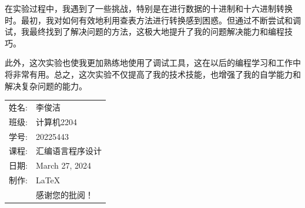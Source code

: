 \documentclass[12pt]{article}
\begin{document}
在实验过程中，我遇到了一些挑战，特别是在进行数据的十进制和十六进制转换时。最初，我对如何有效地利用查表方法进行转换感到困惑。但通过不断尝试和调试，我最终找到了解决问题的方法，这极大地提升了我的问题解决能力和编程技巧。

此外，这次实验也使我更加熟练地使用了调试工具，这在以后的编程学习和工作中将非常有用。总之，这次实验不仅提高了我的技术技能，也增强了我的自学能力和解决复杂问题的能力。
\begin{flushright}\begin{tabular}{rl}
    姓名: & 李俊洁\\
    班级: & 计算机2204 \\
    学号: & 20225443 \\
    课程: & 汇编语言程序设计 \\
    日期: & March 27, 2024 \\
    制作: & \LaTeX \\
    & 感谢您的批阅！
\end{tabular}\end{flushright}
\end{document}
